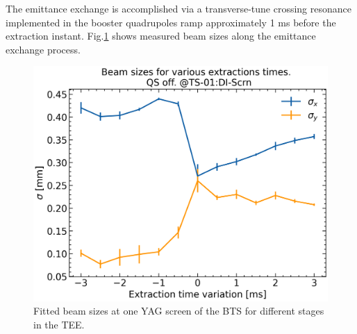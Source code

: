 \documentclass[a4paper,
               keeplastbox,   %
               ]{jacow}
\begin{document}
The emittance exchange is accomplished via a transverse-tune crossing resonance implemented in the booster quadrupoles ramp approximately 1 ms before the extraction instant. Fig.\ref{fig:tee-sigmas} shows measured beam sizes along the emittance exchange process.
\begin{figure}[!htb]
   \centering
   \includegraphics*[width=.9\columnwidth]{THPOPT038_f3.png}
   \caption{Fitted beam sizes at one YAG screen of the BTS for different stages in the TEE.}
   \label{fig:tee-sigmas}
\end{figure}
\end{document}
